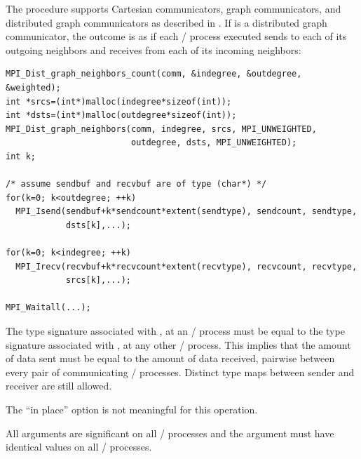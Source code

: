 The  procedure supports Cartesian communicators, graph communicators, and
distributed graph communicators as described
in .
If  is a distributed graph communicator, the outcome is as if each
\MPI/ process executed sends to each of its outgoing neighbors and receives from
each of its incoming neighbors:

\begin{lstlisting}[language={[MPI]C}]
MPI_Dist_graph_neighbors_count(comm, &indegree, &outdegree, &weighted);
int *srcs=(int*)malloc(indegree*sizeof(int));
int *dsts=(int*)malloc(outdegree*sizeof(int));
MPI_Dist_graph_neighbors(comm, indegree, srcs, MPI_UNWEIGHTED,
                         outdegree, dsts, MPI_UNWEIGHTED);
int k;

/* assume sendbuf and recvbuf are of type (char*) */
for(k=0; k<outdegree; ++k)
  MPI_Isend(sendbuf+k*sendcount*extent(sendtype), sendcount, sendtype,
            dsts[k],...); 

for(k=0; k<indegree; ++k)
  MPI_Irecv(recvbuf+k*recvcount*extent(recvtype), recvcount, recvtype,
            srcs[k],...);

MPI_Waitall(...);
\end{lstlisting}

The type signature associated with , 
at an \MPI/ process must be equal to the type signature associated with
,  at any other \MPI/ process.
This implies that the amount of data sent must be equal to the
amount of data received, pairwise between every pair of
communicating \MPI/ processes.
Distinct type maps between sender and receiver are still allowed.
 
The ``in place'' option is not meaningful for this operation.

All arguments are significant on all \MPI/ processes and the argument
 must have identical values on all \MPI/ processes.

